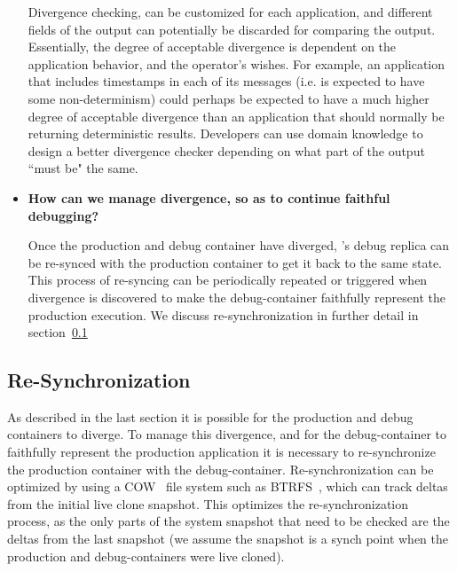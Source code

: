 \begin{itemize}
	Divergence checking, can be customized for each application, and different fields of the output can potentially be discarded for comparing the output.
	Essentially, the degree of acceptable divergence is dependent on the application behavior, and the operator's wishes. 
	For example, an application that includes timestamps in each of its messages (i.e. is expected to have some non-determinism) could perhaps be expected to have a much higher degree of acceptable divergence than an application that should normally be returning deterministic results.
	Developers can use domain knowledge to design a better divergence checker depending on what part of the output ``must be" the same.
		
	\item \textbf{How can we manage divergence, so as to continue faithful debugging?}
	
	Once the production and debug container have diverged, \parikshan's debug replica can be re-synced with the production container to get it back to the same state.
	This process of re-syncing can be periodically repeated or triggered when divergence is discovered to make the debug-container faithfully represent the production execution.
	We discuss re-synchronization in further detail in section~\ref{sec:periodicSynch}
	
\end{itemize}


\subsection{Re-Synchronization}
\label{sec:periodicSynch}

As described in the last section it is possible for the production and debug containers to diverge. 
To manage this divergence, and for the debug-container to faithfully represent the production application it is necessary to re-synchronize the production container with the debug-container.
Re-synchronization can be optimized by using a COW~\cite{cow} file system such as BTRFS~\cite{btrfs}, which can track deltas from the initial live clone snapshot. 
This optimizes the re-synchronization process, as the only parts of the system snapshot that need to be checked are the deltas from the last snapshot (we assume the snapshot is a synch point when the production and debug-containers were live cloned).

